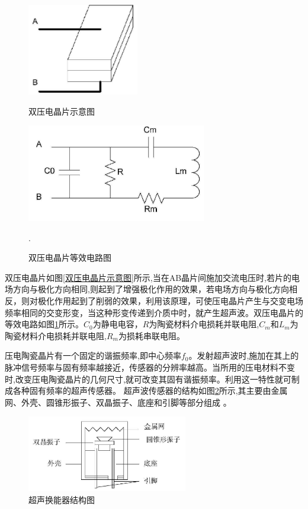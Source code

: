     \begin{figure}[!h]

    	\begin{minipage}{0.5\textwidth}
    		\centering
    		\includegraphics[height=4cm]{figure/双压电晶片示意图.png}
    		\caption{双压电晶片示意图}
    		\label{双压电晶片示意图}
    	\end{minipage}
    \begin{minipage}{0.5\textwidth}
    	\centering
    	\includegraphics[height=4.25cm]{figure/双压电晶片等效电路.png}
    	\caption{双压电晶片等效电路图}
    	\label{双压电晶片等效电路图}.
    \end{minipage}
    \end{figure}

    双压电晶片如图\ref{双压电晶片示意图}所示,当在AB晶片间施加交流电压时,若片的电场方向与极化方向相同,则起到了增强极化作用的效果，若电场方向与极化方向相反，则对极化作用起到了削弱的效果，利用该原理，可使压电晶片产生与交变电场频率相同的交变形变，当这种形变传递到介质中时，就产生超声波。双压电晶片的等效电路如图\ref{双压电晶片等效电路图}所示。$C_0$为静电电容，$R$为陶瓷材料介电损耗并联电阻,$C_m$和$L_m$为陶瓷材料介电损耗并联电阻,$R_m$为损耗串联电阻。\par

    压电陶瓷晶片有一个固定的谐振频率,即中心频率$f_0$。发射超声波时,施加在其上的脉冲信号频率与固有频率越接近，传感器的分辨率越高。当所用的压电材料不变时,改变压电陶瓷晶片的几何尺寸,就可改变其固有谐振频率。利用这一特性就可制成各种固有频率的超声传感器。
    超声波传感器的结构如图\ref{超声换能器结构图}所示,其主要由金属网、外壳、圆锥形振子、双晶振子、底座和引脚等部分组成 。
    \begin{figure}[!h]
    	\centering
    	\includegraphics[width=7cm]{figure/超声换能器结构图.png}
    	\caption{超声换能器结构图}
    	\label{超声换能器结构图}
    \end{figure}


